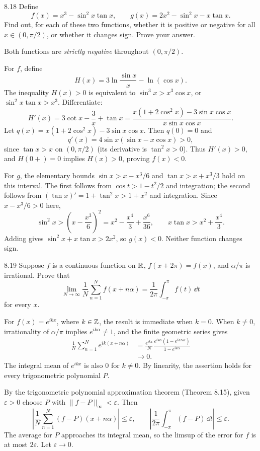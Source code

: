 \documentclass[11pt, oneside]{article}
\begin{document}
\begin{exercise}{8.18}
Define
\[
 f(x)=x^3-\sin^2x\tan x,
 \qquad g(x)=2x^2-\sin^2x-x\tan x.
\]
Find out, for each of these two functions, whether it is positive or negative for all $x\in(0, \pi/2)$, or whether it changes sign. Prove your answer.
\end{exercise}
\begin{solution}
Both functions are \emph{strictly negative} throughout $(0, \pi/2)$.

For $f$, define
\[
 H(x)=3\ln\frac{\sin x}{x}-\ln(\cos x).
\]
The inequality $H(x)>0$ is equivalent to $\sin^3x>x^3\cos x$, or $\sin^2x\tan x>x^3$. Differentiate:
\[
 H'(x)=3\cot x-\frac3x+\tan x
 =\frac{x(1+2\cos^2x)-3\sin x\cos x}
 {x\sin x\cos x}.
\]
Let $q(x)=x(1+2\cos^2x)-3\sin x\cos x$. Then $q(0)=0$ and
\[
 q'(x)=4\sin x(\sin x-x\cos x)>0,
\]
since $\tan x>x$ on $(0, \pi/2)$ (its derivative is $\tan^2x>0$). Thus $H'(x)>0$, and $H(0+)=0$ implies $H(x)>0$, proving $f(x)<0$.

For $g$, the elementary bounds $\sin x>x-x^3/6$ and $\tan x>x+x^3/3$ hold on this interval. The first follows from $\cos t>1-t^2/2$ and integration; the second follows from $(\tan x)'=1+\tan^2x>1+x^2$ and integration. Since $x-x^3/6>0$ here,
\[
 \sin^2x>\left(x-\frac{x^3}6\right)^2
 =x^2-\frac{x^4}3+\frac{x^6}{36},
 \qquad x\tan x>x^2+\frac{x^4}3.
\]
Adding gives $\sin^2x+x\tan x>2x^2$, so $g(x)<0$. Neither function changes sign.
\end{solution}

\begin{exercise}{8.19}
Suppose $f$ is a continuous function on $\mathbb{R}$, $f(x+2\pi)=f(x)$, and $\alpha/\pi$ is irrational. Prove that
\[
 \lim_{N\to\infty}\frac1N\sum_{n=1}^N f(x+n\alpha)
 =\frac1{2\pi}\int_{-\pi}^\pi f(t)\,\dd t
\]
for every $x$.
\end{exercise}
\begin{solution}
For $f(x)=e^{ikx}$, where $k\in\mathbb{Z}$, the result is immediate when $k=0$. When $k\ne0$, irrationality of $\alpha/\pi$ implies $e^{ik\alpha}\ne1$, and the finite geometric series gives
\[
 \begin{aligned}
 \frac1N\sum_{n=1}^Ne^{ik(x+n\alpha)}
 &=\frac{e^{ikx}}N\frac{e^{ik\alpha}(1-e^{ikN\alpha})}{1-e^{ik\alpha}}\\
 &\longrightarrow0.
 \end{aligned}
\]
The integral mean of $e^{ikx}$ is also $0$ for $k\ne0$. By linearity, the assertion holds for every trigonometric polynomial $P$.

By the trigonometric polynomial approximation theorem (Theorem 8.15), given $\varepsilon>0$ choose $P$ with $\|f-P\|_\infty<\varepsilon$. Then
\[
 \left|\frac1N\sum_{n=1}^N(f-P)(x+n\alpha)\right|\le\varepsilon,
 \qquad\left|\frac1{2\pi}\int_{-\pi}^\pi(f-P)\,\dd t\right|\le\varepsilon.
\]
The average for $P$ approaches its integral mean, so the limsup of the error for $f$ is at most $2\varepsilon$. Let $\varepsilon\to0$. 
\end{solution}
\end{document}
